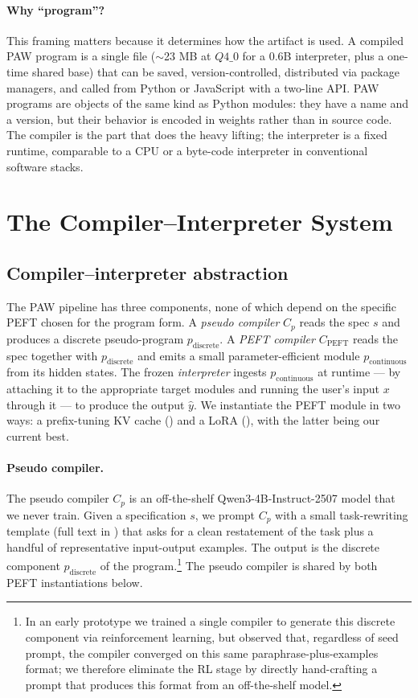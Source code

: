 \documentclass{article}
\theoremstyle{plain}
\theoremstyle{definition}
\theoremstyle{remark}
\begin{document}
\paragraph{Why ``program''?}
This framing matters because it determines how the artifact is used. A compiled PAW program is a single file ($\sim$23 MB at $Q4\_0$ for a 0.6B interpreter, plus a one-time shared base) that can be saved, version-controlled, distributed via package managers, and called from Python or JavaScript with a two-line API. PAW programs are objects of the same kind as Python modules: they have a name and a version, but their behavior is encoded in weights rather than in source code. The compiler is the part that does the heavy lifting; the interpreter is a fixed runtime, comparable to a CPU or a byte-code interpreter in conventional software stacks.


\section{The Compiler--Interpreter System}
\label{sec:architecture}

\subsection{Compiler--interpreter abstraction}
\label{sec:arch_abstraction}

The PAW pipeline has three components, none of which depend on the specific PEFT chosen for the program form. A \emph{pseudo compiler} $C_p$ reads the spec $s$ and produces a discrete pseudo-program $p_{\text{discrete}}$. A \emph{PEFT compiler} $C_{\text{PEFT}}$ reads the spec together with $p_{\text{discrete}}$ and emits a small parameter-efficient module $p_{\text{continuous}}$ from its hidden states. The frozen \emph{interpreter} ingests $p_{\text{continuous}}$ at runtime --- by attaching it to the appropriate target modules and running the user's input $x$ through it --- to produce the output $\hat{y}$. We instantiate the PEFT module in two ways: a prefix-tuning KV cache () and a LoRA (), with the latter being our current best.

\paragraph{Pseudo compiler.}
The pseudo compiler $C_p$ is an off-the-shelf Qwen3-4B-Instruct-2507 model that we never train. Given a specification $s$, we prompt $C_p$ with a small task-rewriting template (full text in ) that asks for a clean restatement of the task plus a handful of representative input-output examples. The output is the discrete component $p_{\text{discrete}}$ of the program.\footnote{In an early prototype we trained a single compiler to generate this discrete component via reinforcement learning, but observed that, regardless of seed prompt, the compiler converged on this same paraphrase-plus-examples format; we therefore eliminate the RL stage by directly hand-crafting a prompt that produces this format from an off-the-shelf model.} The pseudo compiler is shared by both PEFT instantiations below.
\end{document}
